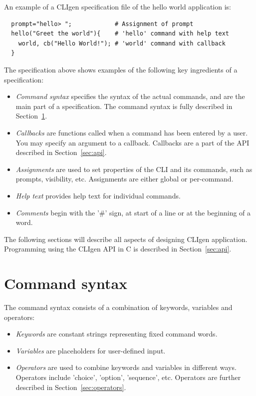 \documentclass[a4paper, 10pt] {article}
\begin{document}
An example of a CLIgen specification file of the hello world application is:
\begin{verbatim}
  prompt="hello> ";            # Assignment of prompt
  hello("Greet the world"){    # 'hello' command with help text
    world, cb("Hello World!"); # 'world' command with callback
  }
\end{verbatim}

The specification above shows examples of the following key ingredients of a specification:
\begin{itemize} 
\item
\emph{Command syntax} specifies the syntax of the actual commands, and
are the main part of a specification. The command syntax is fully
described in Section~\ref{sec:syntax}.
\item
\emph{Callbacks} are functions called when a command has been entered
by a user. You may specify an argument to a callback. Callbacks
are a part of the API described in Section~\ref{sec:api}.
\item
\emph{Assignments} are used to set properties of the CLI and its
commands, such as prompts, visibility, etc. Assignments are either global or per-command.
\item
\emph{Help text} provides help text for individual commands.
\item
\emph{Comments} begin with the '\#' sign, at start of a line or at the beginning of a word.
\end{itemize}

The following sections will describe all aspects of designing CLIgen
application. Programming using the CLIgen API in C is described in
Section~\ref{sec:api}.

\section{Command syntax}
\label{sec:syntax}

The command syntax consists of a combination of keywords, variables and
operators:
\begin{itemize}
\item
\emph{Keywords} are constant strings representing fixed command words.
\item
\emph{Variables} are placeholders for user-defined input.
\item
\emph{Operators} are used to combine keywords and variables in different ways. Operators
include 'choice', 'option', 'sequence', etc. Operators are further described in Section~\ref{sec:operators}.
\end{itemize}
\end{document}
